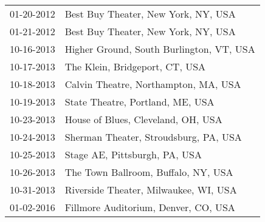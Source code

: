 \begin{supertabular}{ll}
 01-20-2012 &       Best Buy Theater, New York, NY, USA \\
 01-21-2012 &       Best Buy Theater, New York, NY, USA \\
 10-16-2013 &  Higher Ground, South Burlington, VT, USA \\
 10-17-2013 &            The Klein, Bridgeport, CT, USA \\
 10-18-2013 &      Calvin Theatre, Northampton, MA, USA \\
 10-19-2013 &          State Theatre, Portland, ME, USA \\
 10-23-2013 &        House of Blues, Cleveland, OH, USA \\
 10-24-2013 &     Sherman Theater, Stroudsburg, PA, USA \\
 10-25-2013 &             Stage AE, Pittsburgh, PA, USA \\
 10-26-2013 &       The Town Ballroom, Buffalo, NY, USA \\
 10-31-2013 &     Riverside Theater, Milwaukee, WI, USA \\
 01-02-2016 &      Fillmore Auditorium, Denver, CO, USA \\
\end{supertabular}
